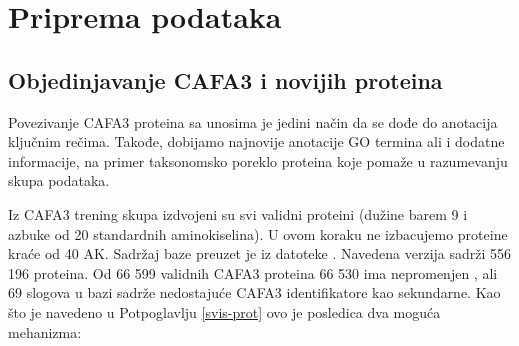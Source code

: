 
\chapter{Priprema podataka} %

\label{Priprema_podataka} %

\section{Objedinjavanje CAFA3 i novijih \swissprot proteina}
\label{objedinjavanje}

Povezivanje CAFA3 proteina sa \swissprot unosima je jedini način da se dođe do
anotacija ključnim rečima. Takođe, dobijamo najnovije anotacije GO termina ali
i dodatne informacije, na primer taksonomsko poreklo proteina koje pomaže
u razumevanju skupa podataka.

Iz CAFA3 trening skupa izdvojeni su svi validni proteini (dužine barem 9 i
azbuke od 20 standardnih aminokiselina). U ovom koraku ne izbacujemo proteine
kraće od 40 AK.  Sadržaj \swissprot baze preuzet je iz datoteke  \cite{sprot}.
Navedena verzija sadrži 556 196 proteina.  Od 66 599 validnih CAFA3 proteina 66
530 ima nepromenjen , ali 69 slogova u
\swissprot bazi sadrže nedostajuće CAFA3 identifikatore kao sekundarne. Kao što
je navedeno u Potpoglavlju \ref{svis-prot} ovo je posledica dva moguća
mehanizma:

